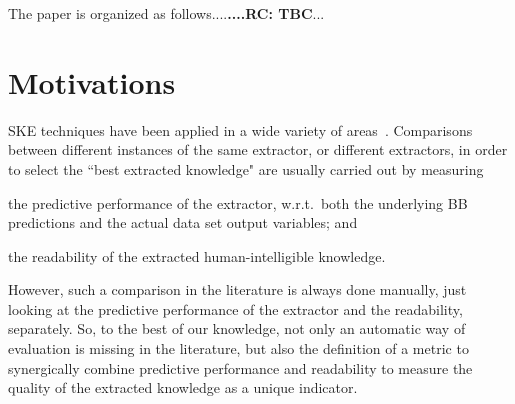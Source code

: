 \documentclass{article}
\newenvironment{inlinelist}{\begin{enumerate*}[label=\emph{(\roman{*})}]}{\end{enumerate*}}
\begin{document}
The paper is organized as follows....\textbf{....RC: TBC}...

\section{Motivations}\label{sec:motivation}

SKE techniques have been applied in a wide variety of areas~\cite{steiner2006using,hayashi2000comparison,sabbatini22LPFSKE}.
%
Comparisons between different instances of the same extractor, or different extractors, in order to select the ``best extracted knowledge" are usually carried out by measuring
%
\begin{inlinelist}
	\item the predictive performance of the extractor, w.r.t.\ both the underlying BB predictions and the actual data set output variables; and
	\item the readability of the extracted human-intelligible knowledge.
\end{inlinelist}
%
However, such a comparison in the literature is always done manually, just looking at the predictive performance of the extractor and the readability, separately.
So, to the best of our knowledge, not only an automatic way of evaluation is missing in the literature, but also the definition of a metric to synergically combine predictive performance and readability to measure the quality of the extracted knowledge as a unique indicator.
\end{document}

